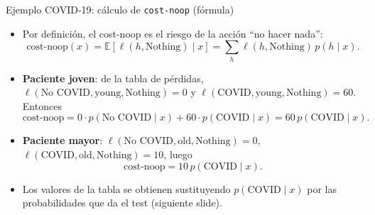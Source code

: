 \begin{frame}{Ejemplo COVID-19: cálculo de \texttt{cost-noop} (fórmula)}
\small
\begin{itemize}
  \item Por definición, el cost-noop es el riesgo de la acción ``no hacer nada'':
  \[
    \text{cost-noop}(x) = \mathbb{E}[\ell(h,\text{Nothing})\mid x]
    = \sum_h \ell(h,\text{Nothing})\,p(h\mid x).
  \]
  \item \textbf{Paciente joven}: de la tabla de pérdidas, \(\ell(\text{No COVID},\text{young},\text{Nothing})=0\) y \(\ell(\text{COVID},\text{young},\text{Nothing})=60\). Entonces
  \[
    \text{cost-noop} = 0\cdot p(\text{No COVID}\mid x) + 60\cdot p(\text{COVID}\mid x)
    = 60\,p(\text{COVID}\mid x).
  \]
  \item \textbf{Paciente mayor}: \(\ell(\text{No COVID},\text{old},\text{Nothing})=0\), \(\ell(\text{COVID},\text{old},\text{Nothing})=10\), luego
  \[
    \text{cost-noop} = 10\,p(\text{COVID}\mid x).
  \]
  \item Los valores de la tabla se obtienen sustituyendo \(p(\text{COVID}\mid x)\) por las probabilidades que da el test (siguiente slide).
\end{itemize}
\end{frame}

